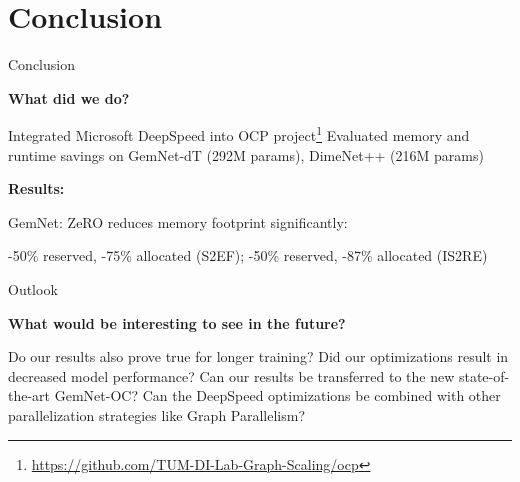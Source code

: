 \section{Conclusion}

\begin{frame}{Conclusion}
    \begin{small}
        \textbf{What did we do?} \vspace*{-0.3cm} 
        \begin{itemize}
            \bitem Integrated Microsoft DeepSpeed into OCP project\footnote{\url{https://github.com/TUM-DI-Lab-Graph-Scaling/ocp}} \vspace*{-0.3cm} 
            \bitem Evaluated memory and runtime savings on GemNet-dT (292M params), DimeNet++ (216M params) \vspace*{-0.3cm} 
        \end{itemize}
        \textbf{Results:} \vspace*{-0.3cm}
        \begin{itemize}
            \bitem GemNet: ZeRO reduces memory footprint significantly: \vspace*{-0.3cm} \\
            \begin{center}
                -50\% reserved, -75\% allocated (S2EF); -50\% reserved, -87\% allocated (IS2RE) \vspace*{-0.3cm} 
            \end{center}
        \end{itemize}
    \end{small}
\end{frame}

\begin{frame}{Outlook}
    \begin{small}
        \textbf{What would be interesting to see in the future?} 
        \begin{itemize}
            \bitem Do our results also prove true for longer training? 
            \bitem Did our optimizations result in decreased model performance? 
            \bitem Can our results be transferred to the new state-of-the-art GemNet-OC? 
            \bitem Can the DeepSpeed optimizations be combined with other parallelization strategies 
            like Graph Parallelism?
        \end{itemize}
    \end{small}
\end{frame}